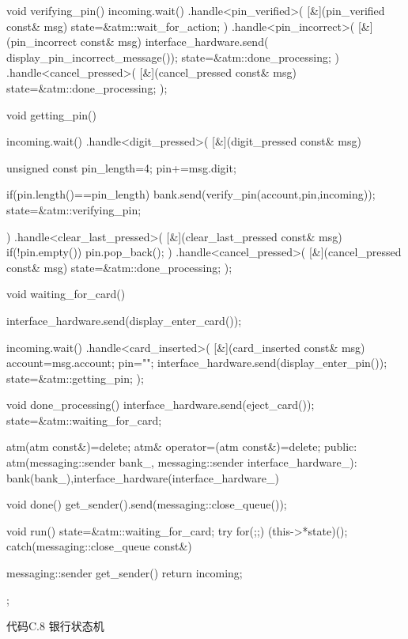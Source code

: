 \begin{cpp}
{  void verifying_pin()
  {
    incoming.wait()
      .handle<pin_verified>(
       [&](pin_verified const& msg)
       {
         state=&atm::wait_for_action;
       })
      .handle<pin_incorrect>(
       [&](pin_incorrect const& msg)
       {
         interface_hardware.send(
         display_pin_incorrect_message());
         state=&atm::done_processing;
       })
      .handle<cancel_pressed>(
       [&](cancel_pressed const& msg)
       {
         state=&atm::done_processing;
       });
  }

  void getting_pin()
  {
    incoming.wait()
      .handle<digit_pressed>(
       [&](digit_pressed const& msg)
       {
         unsigned const pin_length=4;
         pin+=msg.digit;

         if(pin.length()==pin_length)
         {
           bank.send(verify_pin(account,pin,incoming));
           state=&atm::verifying_pin;
         }
       })
      .handle<clear_last_pressed>(
       [&](clear_last_pressed const& msg)
       {
         if(!pin.empty())
         {
           pin.pop_back();
         }
       })
      .handle<cancel_pressed>(
       [&](cancel_pressed const& msg)
       {
         state=&atm::done_processing;
       });
  }

  void waiting_for_card()
  {
    interface_hardware.send(display_enter_card());

    incoming.wait()
      .handle<card_inserted>(
       [&](card_inserted const& msg)
       {
         account=msg.account;
         pin="";
         interface_hardware.send(display_enter_pin());
         state=&atm::getting_pin;
       });
  }

  void done_processing()
  {
    interface_hardware.send(eject_card());
    state=&atm::waiting_for_card;
  }

  atm(atm const&)=delete;
  atm& operator=(atm const&)=delete;
public:
  atm(messaging::sender bank_,
  messaging::sender interface_hardware_):
  bank(bank_),interface_hardware(interface_hardware_)
  {}

  void done()
  {
    get_sender().send(messaging::close_queue());
  }

  void run()
  {
    state=&atm::waiting_for_card;
    try
    {
      for(;;)
      {
        (this->*state)();
      }
    }
    catch(messaging::close_queue const&)
    {
    }
  }

  messaging::sender get_sender()
  {
    return incoming;
  }
};
\end{cpp}

代码C.8 银行状态机

